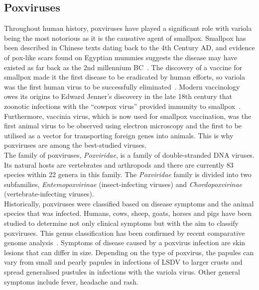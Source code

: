 \subsection{Poxviruses}
Throughout human history, poxviruses have played a significant role with variola being the most notorious as it is the causative agent of smallpox. Smallpox has been described in Chinese texts dating back to the 4th Century AD, and evidence of pox-like scars found on Egyptian mummies suggests the disease may have existed as far back as the 2nd millennium BC~\cite{fenner1988history}. The discovery of a vaccine for smallpox made it the first disease to be eradicated by human efforts, so variola was the first human virus to be successfully eliminated~\cite{fenner2000adventures}. Modern vaccinology owes its origins to Edward Jenner's discovery in the late 18th century that zoonotic infections with the ``cowpox virus'' provided immunity to smallpox~\cite{fenner1988history}. Furthermore, vaccinia virus, which is now used for smallpox vaccination, was the first animal virus to be observed using electron microscopy and the first to be utilised as a vector for transporting foreign genes into animals. This is why poxviruses are among the best-studied viruses. \\
The family of poxviruses, \textit{Poxviridae}, is a family of double-stranded \ac{DNA} viruses. Its natural hosts are vertebrates and arthropods and there are currently 83 species within 22 genera in this family. The \textit{Poxviridae} family is divided into two subfamilies, \textit{Entemopoxvirinae} (insect-infecting viruses) and \textit{Chordopoxvirinae} (vertebrate-infecting viruses). \\
Historically, poxviruses were classified based on disease symptoms and the animal species that was infected. Humans, cows, sheep, goats, horses and pigs have been studied to determine not only clinical symptoms but with the aim to classify poxviruses. This genus classification has been confirmed by recent comparative genome analysis~\cite{gubser2004poxvirus}. Symptoms of disease caused by a poxvirus infection are skin lesions that can differ in size. Depending on the type of poxvirus, the papules can vary from small and pearly papules in infections of \ac{LSDV} to larger crusts and spread generalised pustules in infections with the variola virus. Other general symptoms include fever, headache and rash.

